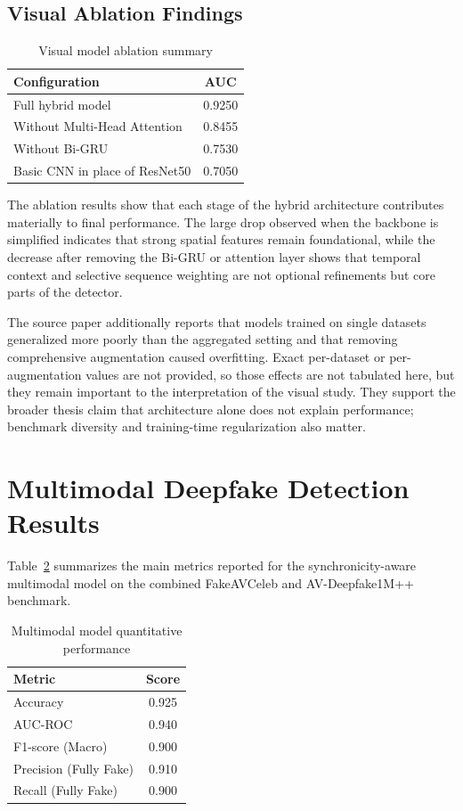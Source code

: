 \subsection{Visual Ablation Findings}

\begin{table}[H]
\centering
\caption{Visual model ablation summary}
\label{tab:visual-ablation}
\begin{tabular}{l c}
\toprule
\textbf{Configuration} & \textbf{AUC} \\
\midrule
Full hybrid model & 0.9250 \\
Without Multi-Head Attention & 0.8455 \\
Without Bi-GRU & 0.7530 \\
Basic CNN in place of ResNet50 & 0.7050 \\
\bottomrule
\end{tabular}
\end{table}

The ablation results show that each stage of the hybrid architecture contributes materially to final performance. The large drop observed when the backbone is simplified indicates that strong spatial features remain foundational, while the decrease after removing the Bi-GRU or attention layer shows that temporal context and selective sequence weighting are not optional refinements but core parts of the detector.

The source paper additionally reports that models trained on single datasets generalized more poorly than the aggregated setting and that removing comprehensive augmentation caused overfitting. Exact per-dataset or per-augmentation values are not provided, so those effects are not tabulated here, but they remain important to the interpretation of the visual study. They support the broader thesis claim that architecture alone does not explain performance; benchmark diversity and training-time regularization also matter.

\section{Multimodal Deepfake Detection Results}

Table~\ref{tab:multimodal-metrics} summarizes the main metrics reported for the synchronicity-aware multimodal model on the combined FakeAVCeleb and AV-Deepfake1M++ benchmark.

\begin{table}[H]
\centering
\caption{Multimodal model quantitative performance}
\label{tab:multimodal-metrics}
\begin{tabular}{l c}
\toprule
\textbf{Metric} & \textbf{Score} \\
\midrule
Accuracy & 0.925 \\
AUC-ROC & 0.940 \\
F1-score (Macro) & 0.900 \\
Precision (Fully Fake) & 0.910 \\
Recall (Fully Fake) & 0.900 \\
\bottomrule
\end{tabular}
\end{table}

